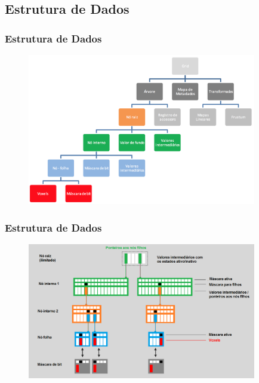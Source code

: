 \documentclass{beamer}
\begin{document}
\subsection{Estrutura de Dados}
\begin{frame}

\frametitle{Estrutura de Dados}

\begin{figure}[!htb]
\center
\includegraphics[width=10cm]{tree_structure}  
\label{vdbtree}
\end{figure}

\end{frame}

\begin{frame}

\frametitle{Estrutura de Dados}

\begin{figure}[!htb]
\center
\includegraphics[width=10cm]{tree_inverted}  
\label{vdbtree}
\end{figure}

\end{frame}
\end{document}
